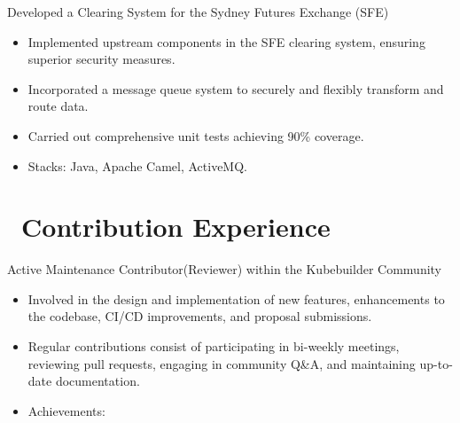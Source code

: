 \documentclass{resume}
\begin{document}
Developed a Clearing System for the Sydney Futures Exchange (SFE)
\begin{itemize}
  \item Implemented upstream components in the SFE clearing system, ensuring superior security measures.
  \item Incorporated a message queue system to securely and flexibly transform and route data.
  \item Carried out comprehensive unit tests achieving 90\% coverage.
  \item Stacks: Java, Apache Camel, ActiveMQ.
\end{itemize}

\section{\faUsers\ Contribution Experience}

Active Maintenance Contributor(Reviewer) within the Kubebuilder Community
\begin{itemize}
  \item Involved in the design and implementation of new features, enhancements to the codebase, CI/CD improvements, and proposal submissions.
  \item Regular contributions consist of participating in bi-weekly meetings, reviewing pull requests, engaging in community Q\&A, and maintaining up-to-date documentation.
  \item Achievements:
     \textperiodcentered\
     \textperiodcentered\
     \textperiodcentered\
\end{itemize}

\end{document}
